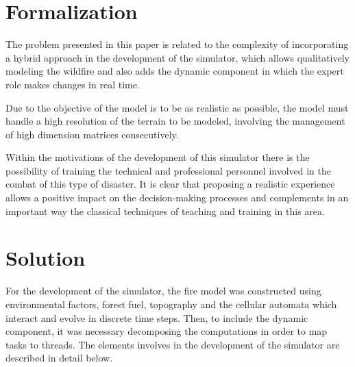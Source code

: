 \documentclass[conference]{IEEEtran}
\begin{document}
  \section{Formalization}
    
    
    The problem presented in this paper is related to the complexity of incorporating a hybrid 
    approach in the development of the simulator, which allows qualitatively modeling the wildfire
    and also adds the dynamic component in which the expert role makes changes in real time.
    
    Due to the objective of the model is to be as realistic as possible, the model must handle a 
    high resolution of the terrain to be modeled, involving the management of high dimension matrices 
    consecutively.
    
    Within the motivations of the development of this simulator there is the possibility of 
    training the technical and professional personnel involved in the combat of this type of 
    disaster. It is clear that proposing a realistic experience allows a positive impact on the 
    decision-making processes and complements in an important way the classical techniques of 
    teaching and training in this area.
    

  \section{Solution}

    For the development of the simulator, the fire model was constructed using 
    environmental factors, forest fuel, topography and the cellular automata which interact and evolve in 
    discrete time steps. Then, to include the dynamic component, it was necessary decomposing 
    the computations in order to map tasks to threads. The elements involves in the
    development of the simulator are described in detail below.
\end{document}
